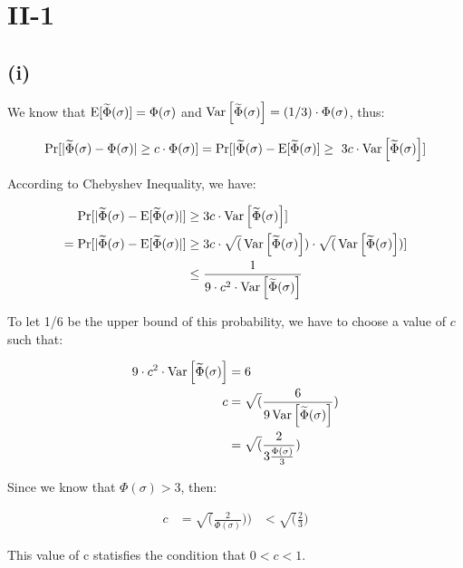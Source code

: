 \section*{II-1}
\subsection*{(i)}
We know that $\operatorname{E}[\widetilde{\Phi}(\sigma)] = \Phi(\sigma)$ and $\operatorname{Var}\left[\widetilde{\Phi}(\sigma)\right] = (1/3)\cdot \Phi(\sigma)$, thus:

$$\Pr[|\widetilde{\Phi}(\sigma)- \Phi(\sigma)| \geq c\cdot \Phi(\sigma)]
= \Pr[|\widetilde{\Phi}(\sigma)- \operatorname{E}[\widetilde{\Phi}(\sigma)] \geq \
3c \cdot \operatorname{Var}\left[\widetilde{\Phi}(\sigma)\right]]$$

According to Chebyshev Inequality, we have:

\begin{equation*}
  \begin{aligned}
\Pr[|\widetilde{\Phi}(\sigma)- \operatorname{E}[\widetilde{\Phi}(\sigma)|] &\geq 
3c \cdot \operatorname{Var}\left[\widetilde{\Phi}(\sigma)\right]] \\
= \Pr[|\widetilde{\Phi}(\sigma)- \operatorname{E}[\widetilde{\Phi}(\sigma)|] 
&\geq 3c \cdot \sqrt(\operatorname{Var}\left[\widetilde{\Phi}(\sigma)\right]) \cdot \sqrt(\operatorname{Var}\left[\widetilde{\Phi}(\sigma)\right])] \\
&\leq \frac{1}{9 \cdot c^2 \cdot
  \operatorname{Var}\left[\widetilde{\Phi}(\sigma)\right]}
\end{aligned}
\end{equation*}

To let 1/6 be the upper bound of this probability, we have to choose a value of $c$ such that:

\begin{equation*}
  \begin{aligned}
9 \cdot c^2 \cdot \operatorname{Var}\left[\widetilde{\Phi}(\sigma)\right] &= 6\\
c &= \sqrt(\frac{6}{9\operatorname{Var}\left[\widetilde{\Phi}(\sigma)\right]})\\
&= \sqrt(\frac{2}{3 \frac{\Phi(\sigma)}{3}})
\end{aligned}
\end{equation*}

Since we know that $\Phi(\sigma) > 3$, then:

\begin{equation*}
  \begin{aligned}
c &= \sqrt(\frac{2}{\Phi(\sigma)}))
& < \sqrt(\frac{2}{3})
\end{aligned}
\end{equation*}

This value of c statisfies the condition that $0 < c < 1$.

